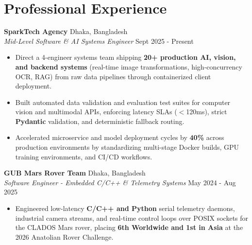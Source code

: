 \documentclass[9.5pt,a4paper]{article}
\begin{document}
\section*{Professional Experience}
\noindent
\textbf{SparkTech Agency} \hfill Dhaka, Bangladesh\\
\textit{Mid-Level Software \& AI Systems Engineer} \hfill Sept 2025 - Present
\begin{itemize}
    \item Direct a 4-engineer systems team shipping \textbf{20+ production AI, vision, and backend systems} (real-time image transformations, high-concurrency OCR, RAG) from raw data pipelines through containerized client deployment.
    \item Built automated data validation and evaluation test suites for computer vision and multimodal APIs, enforcing latency SLAs ($<$120ms), strict \textbf{Pydantic} validation, and deterministic fallback routing.
    \item Accelerated microservice and model deployment cycles by \textbf{40\%} across production environments by standardizing multi-stage Docker builds, GPU training environments, and CI/CD workflows.
\end{itemize}
\vspace{0.6pt}
\noindent
\textbf{GUB Mars Rover Team} \hfill Dhaka, Bangladesh\\
\textit{Software Engineer - Embedded C/C++ \& Telemetry Systems} \hfill May 2024 - Aug 2025
\begin{itemize}
    \item Engineered low-latency \textbf{C/C++ and Python} serial telemetry daemons, industrial camera streams, and real-time control loops over POSIX sockets for the CLADOS Mars rover, placing \textbf{6th Worldwide and 1st in Asia} at the 2026 Anatolian Rover Challenge.
\end{itemize}
\vspace{0.6pt}
\end{document}
